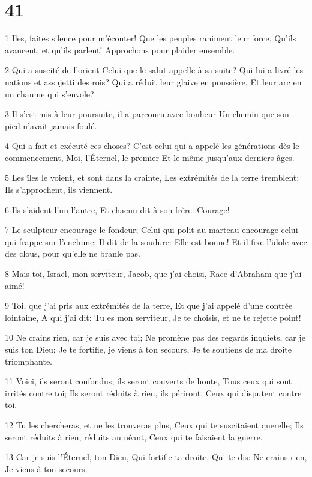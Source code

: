 \chapter{41}

\par 1 Iles, faites silence pour m'écouter! Que les peuples raniment leur force, Qu'ils avancent, et qu'ils parlent! Approchons pour plaider ensemble.
\par 2 Qui a suscité de l'orient Celui que le salut appelle à sa suite? Qui lui a livré les nations et assujetti des rois? Qui a réduit leur glaive en poussière, Et leur arc en un chaume qui s'envole?
\par 3 Il s'est mis à leur poursuite, il a parcouru avec bonheur Un chemin que son pied n'avait jamais foulé.
\par 4 Qui a fait et exécuté ces choses? C'est celui qui a appelé les générations dès le commencement, Moi, l'Éternel, le premier Et le même jusqu'aux derniers âges.
\par 5 Les îles le voient, et sont dans la crainte, Les extrémités de la terre tremblent: Ils s'approchent, ils viennent.
\par 6 Ils s'aident l'un l'autre, Et chacun dit à son frère: Courage!
\par 7 Le sculpteur encourage le fondeur; Celui qui polit au marteau encourage celui qui frappe sur l'enclume; Il dit de la soudure: Elle est bonne! Et il fixe l'idole avec des clous, pour qu'elle ne branle pas.
\par 8 Mais toi, Israël, mon serviteur, Jacob, que j'ai choisi, Race d'Abraham que j'ai aimé!
\par 9 Toi, que j'ai pris aux extrémités de la terre, Et que j'ai appelé d'une contrée lointaine, A qui j'ai dit: Tu es mon serviteur, Je te choisis, et ne te rejette point!
\par 10 Ne crains rien, car je suis avec toi; Ne promène pas des regards inquiets, car je suis ton Dieu; Je te fortifie, je viens à ton secours, Je te soutiens de ma droite triomphante.
\par 11 Voici, ils seront confondus, ils seront couverts de honte, Tous ceux qui sont irrités contre toi; Ils seront réduits à rien, ils périront, Ceux qui disputent contre toi.
\par 12 Tu les chercheras, et ne les trouveras plus, Ceux qui te suscitaient querelle; Ils seront réduits à rien, réduits au néant, Ceux qui te faisaient la guerre.
\par 13 Car je suis l'Éternel, ton Dieu, Qui fortifie ta droite, Qui te dis: Ne crains rien, Je viens à ton secours.
